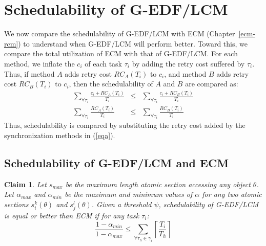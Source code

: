 \documentclass[12pt,english]{report}
\newtheorem{clm}{Claim}
\begin{document}
\section{Schedulability of G-EDF/LCM}
\label{performance g-edf-lcm}
We now compare the schedulability of G-EDF/LCM with ECM (Chapter~\ref{ecm-rcm}) to understand when G-EDF/LCM will perform better. 
Toward this, we compare the total utilization of ECM with that of G-EDF/LCM. For each method, we inflate the $c_i$ of each task $\tau_i$ by adding the retry cost suffered by $\tau_i$. Thus, if method $A$ adds retry cost $RC_A(T_i)$ to $c_i$, and method $B$ adds retry cost $RC_B(T_i)$ to $c_i$, then the schedulability of $A$ and $B$ are compared as:
\begin{eqnarray}
\sum_{\forall \tau_{i}}\frac{c_{i}+RC_A(T_{i})}{T_{i}} & \le & \sum_{\forall \tau_{i}}\frac{c_{i}+RC_B(T_{i})}{T_{i}}\nonumber\\
\sum_{\forall \tau_{i}}\frac{RC_A(T_{i})}{T_{i}} & \le & \sum_{\forall \tau_{i}}\frac{RC_B(T_{i})}{T_{i}}
\label{eqa}\end{eqnarray}
Thus, schedulability is compared by substituting the retry cost added by the synchronization methods in (\ref{eqa}).

\subsection{Schedulability of G-EDF/LCM and ECM}
\begin{clm}\label{lcm versus ecm}
Let $s_{max}$ be the maximum length atomic section accessing any object $\theta$. Let $\alpha_{max}$ and $\alpha_{min}$ be the maximum and minimum values of $\alpha$ for any two atomic sections $s_i^k(\theta)$ and $s_j^l(\theta)$. Given a threshold $\psi$, schedulability of G-EDF/LCM is equal or better than ECM if for any task $\tau_i$:
\begin{equation}
\frac{1-\alpha_{min}}{1-\alpha_{max}} \le \sum_{\forall \tau_h \in \gamma_i}\left\lceil\frac{T_i}{T_h}\right\rceil
\label{edf-lcm-ecm}\end{equation}
\end{clm}
\end{document}
